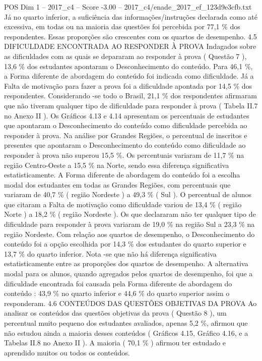 \begin{textsample}{POS Dim 1 – 2017\_c4 – Score -3.00 – 2017\_c4/enade\_2017\_ef\_123d9e3cfb.txt}
Já no quarto inferior, a suficiência das informações/instruções declarada como até excessiva, em todas ou na maioria das questões foi percebida por 77,1 \% dos respondentes.
Essas proporções são crescentes com os quartos de desempenho. 4.5 DIFICULDADE ENCONTRADA AO RESPONDER À PROVA Indagados sobre as dificuldades com as quais se depararam ao responder à prova ( Questão 7 ), 13,6 \% dos estudantes apontaram o Desconhecimento do conteúdo.
Para 46,1 \%, a Forma diferente de abordagem do conteúdo foi indicada como dificuldade.
Já a Falta de motivação para fazer a prova foi a dificuldade apontada por 14,5 \% dos respondentes.
Considerando -se todo o Brasil, 21,1 \% dos respondentes afirmaram que não tiveram qualquer tipo de dificuldade para responder à prova ( Tabela II.7 no Anexo II ).
Os Gráficos 4.13 e 4.14 apresentam os percentuais de estudantes que apontaram o Desconhecimento do conteúdo como dificuldade percebida ao responder à prova.
Na análise por Grandes Regiões, o percentual de inscritos e presentes que apontaram o Desconhecimento do conteúdo como dificuldade ao responder à prova não superou 15,5 \%.
Os percentuais variaram de 11,7 \% na região Centro-Oeste a 15,5 \% na Norte, sendo essa diferença significativa estatisticamente.
A Forma diferente de abordagem do conteúdo foi a escolha modal dos estudantes em todas as Grandes Regiões, com percentuais que variaram de 40,7 \% ( região Nordeste ) a 49,3 \% ( Sul ).
O percentual de alunos que citaram a Falta de motivação como dificuldade variou de 13,4 \% ( região Norte ) a 18,2 \% ( região Nordeste ).
Os que declararam não ter qualquer tipo de dificuldade para responder à prova variaram de 19,0 \% na região Sul a 23,3 \% na região Nordeste.
Com relação aos quartos de desempenho, o Desconhecimento do conteúdo foi a opção escolhida por 14,3 \% dos estudantes do quarto superior e 13,7 \% do quarto inferior.
Nota -se que não há diferença significativa estatisticamente entre as proporções dos quartos de desempenho.
A alternativa modal para os alunos, quando agregados pelos quartos de desempenho, foi que a dificuldade encontrada foi causada pela Forma diferente de abordagem do conteúdo : 43,9 \% no quarto inferior e 44,6 \% do quarto superior assim o responderam. 4.6 CONTEÚDOS DAS QUESTÕES OBJETIVAS DA PROVA Ao analisar os conteúdos das questões objetivas da prova ( Questão 8 ), um percentual muito pequeno dos estudantes avaliados, apenas 5,2 \%, afirmou que não estudou ainda a maioria desses conteúdos ( Gráficos 4.15, Gráfico 4.16, e a Tabelas II.8 no Anexo II ).
A maioria ( 70,1 \% ) afirmou ter estudado e aprendido muitos ou todos os conteúdos.

\end{textsample}
